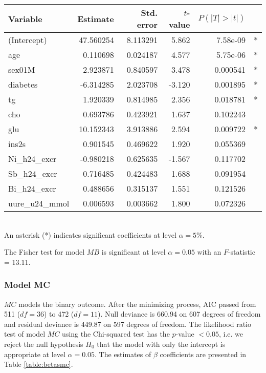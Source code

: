 \begin{table}
\centering
{}
\begin{tabular}{lrrrrl}
\toprule
Variable & Estimate & Std. error & $t$-value & $P(|T|>|t|)$ &\\
\midrule
(Intercept)&   47.560254  & 8.113291  & 5.862 &7.58e-09&* \\
age         &   0.110698&   0.024187 &  4.577& 5.75e-06&* \\
sex01M    & 2.923871&   0.840597  & 3.478 &0.000541&* \\
diabetes   &   -6.314285  & 2.023708&  -3.120 &0.001895&* \\ 
tg         &    1.920339  & 0.814985 & 2.356 &0.018781&*   \\
cho         &   0.693786 &  0.423921 &  1.637& 0.102243  & \\ 
glu         &  10.152343  & 3.913886  & 2.594 &0.009722&* \\
ins2s       &   0.901545 &  0.469622  & 1.920& 0.055369 & \\
Ni\_h24\_excr  &-0.980218 &  0.625635 & -1.567& 0.117702&\\    
Sb\_h24\_excr    &0.716485 &  0.424483 &  1.688 &0.091954&\\ 
Bi\_h24\_excr   & 0.488656  & 0.315137  & 1.551& 0.121526 & \\  
uure\_u24\_mmol & 0.006593 &  0.003662 &  1.800& 0.072326 &\\
\bottomrule
\end{tabular}
\label{table:betasmb} \\
{\footnotesize An asterisk (*) indicates significant coefficients at level $\alpha=5\%$.}
\end{table}

The Fisher test for model $MB$ is significant at level $\alpha=0.05$ with an $F$-statistic = 13.11.

\subsubsection{Model MC}
$MC$ models the binary outcome. After the minimizing process, AIC passed from 511 ($df=36$) to 472 ($df=11$). Null deviance is 660.94 on 607 degrees of freedom and residual deviance is 449.87 on 597 degrees of freedom. The likelihood ratio test of model $MC$ using the Chi-squared test has the $p$-value $<0.05$, i.e. we reject the null hypothesis $H_0$ that the model with only the intercept is appropriate at level $\alpha=0.05$. The estimates of $\beta$ coefficients are presented in Table \ref{table:betasmc}.

